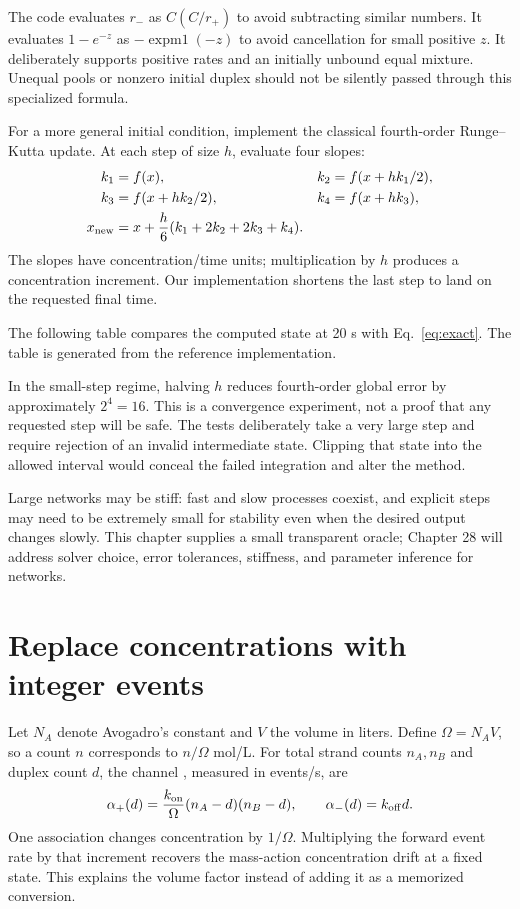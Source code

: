 
The code evaluates $r_-$ as $C(C/r_+)$ to avoid subtracting similar numbers.
It evaluates $1-e^{-z}$ as $-\operatorname{expm1}(-z)$ to avoid cancellation
for small positive $z$. It deliberately supports positive rates and an
initially unbound equal mixture. Unequal pools or nonzero initial duplex
should not be silently passed through this specialized formula.

For a more general initial condition, implement the classical fourth-order
Runge--Kutta update. At each step of size $h$, evaluate four slopes:
\begin{align}
 k_1&=f(x),& k_2&=f(x+hk_1/2),\\
 k_3&=f(x+hk_2/2),& k_4&=f(x+hk_3),\\
 x_{\rm new}&=x+\frac h6(k_1+2k_2+2k_3+k_4).
\end{align}
The slopes have concentration/time units; multiplication by $h$ produces
a concentration increment. Our implementation shortens the last step to
land on the requested final time.


The following table compares the computed state at 20 s with
Eq.~\ref{eq:exact}. The table is generated from the reference implementation.
\begin{center}\end{center}
In the small-step regime, halving $h$ reduces fourth-order global error
by approximately $2^4=16$. This is a convergence experiment, not a proof
that any requested step will be safe. The tests deliberately take a very
large step and require rejection of an invalid intermediate state.
Clipping that state into the allowed interval would conceal the failed
integration and alter the method.

Large networks may be stiff: fast and slow processes coexist, and explicit
steps may need to be extremely small for stability even when the desired
output changes slowly. This chapter supplies a small transparent oracle;
Chapter 28 will address solver choice, error tolerances, stiffness, and
parameter inference for networks.

\section{Replace concentrations with integer events}

Let $N_A$ denote Avogadro's constant and $V$ the volume in liters.
Define $\Omega=N_A V$, so a count $n$ corresponds to $n/\Omega$ mol/L.
For total strand counts $n_A,n_B$ and duplex count $d$, the channel
, measured in events/s, are
\begin{equation}
 \alpha_+(d)=\frac{k_{\rm on}}{\Omega}(n_A-d)(n_B-d),
 \qquad \alpha_-(d)=k_{\rm off}d.
 \label{eq:propensity}
\end{equation}
One association changes concentration by $1/\Omega$.
Multiplying the forward event rate by that increment recovers the
mass-action concentration drift at a fixed state. This explains the
volume factor instead of adding it as a memorized conversion.

